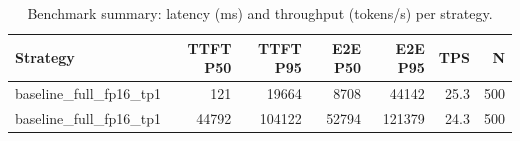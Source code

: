 \begin{table}
\caption{Benchmark summary: latency (ms) and throughput (tokens/s) per strategy.}
\label{tab:summary}
\begin{tabular}{lrrrrrr}
\toprule
Strategy & TTFT P50 & TTFT P95 & E2E P50 & E2E P95 & TPS & N \\
\midrule
baseline_full_fp16_tp1 & 121 & 19664 & 8708 & 44142 & 25.3 & 500 \\
baseline_full_fp16_tp1 & 44792 & 104122 & 52794 & 121379 & 24.3 & 500 \\
\bottomrule
\end{tabular}
\end{table}
